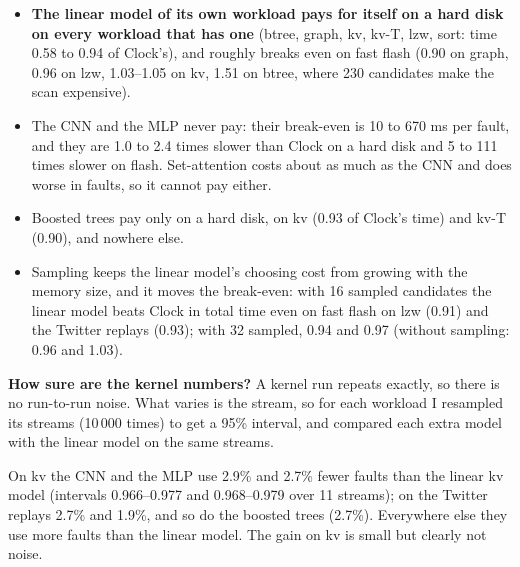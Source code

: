 \documentclass[10.5pt,a4paper]{article}
\newcommand{\best}[1]{\textbf{\textcolor{good}{#1}}}
\begin{document}
\begin{table}[h]
\centering\scriptsize

\caption{Break-even and time relative to Clock, at 10\% memory (one instruction taken as one nanosecond).}
\end{table}

\begin{itemize}
\item \best{The linear model of its own workload pays for itself on a hard disk on every workload that has one} (btree, graph, kv, kv-T, lzw, sort: time 0.58 to 0.94 of
  Clock's), and roughly breaks even on fast flash (0.90 on graph, 0.96 on lzw, 1.03--1.05 on kv, 1.51 on btree, where 230 candidates make the scan expensive).
\item The CNN and the MLP never pay: their break-even is 10 to 670 ms per fault, and they are 1.0 to 2.4 times slower than Clock on a hard disk
  and 5 to 111 times slower on flash. Set-attention costs about as much as the CNN and does worse in faults, so it cannot pay either.
\item Boosted trees pay only on a hard disk, on kv (0.93 of Clock's time) and kv-T (0.90), and nowhere else.
\item Sampling keeps the linear model's choosing cost from growing with the memory size, and it moves the break-even: with 16 sampled candidates the linear model
  beats Clock in total time even on fast flash on lzw (0.91) and the Twitter replays (0.93); with 32 sampled, 0.94 and 0.97 (without sampling: 0.96 and 1.03).
\end{itemize}

\textbf{How sure are the kernel numbers?} A kernel run repeats exactly, so there is no run-to-run noise. What varies is the stream, so for each workload I resampled
its streams (10\,000 times) to get a 95\% interval, and compared each extra model with the linear model on the same streams.

\begin{table}[h]
\centering\scriptsize

\caption{Faults relative to Clock in xv6 at 10\% memory, with 95\% intervals across the streams of each workload.}
\end{table}

\begin{table}[h]
\centering\small

\caption{Extra models against the linear model of the same workload, on the same streams, in xv6.}
\end{table}

On kv the CNN and the MLP use 2.9\% and 2.7\% fewer faults than the linear kv model (intervals 0.966--0.977 and 0.968--0.979 over 11 streams); on the Twitter replays 2.7\% and 1.9\%,
and so do the boosted trees (2.7\%). Everywhere else they use more faults than the linear model. The gain on kv is small but clearly not noise.
\end{document}
